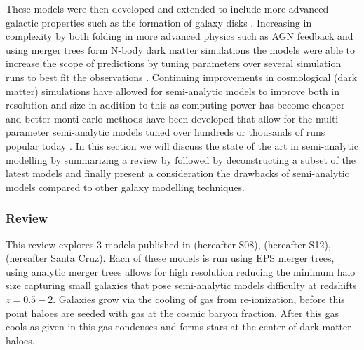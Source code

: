 
These models were then developed and extended to include more advanced galactic properties such as the formation of galaxy disks \citep{Mo1998TheDiscs}. Increasing in complexity by both folding in more advanced physics such as AGN feedback and using merger trees form N-body dark matter simulations the models were able to increase the scope of predictions by tuning parameters over several simulation runs to best fit the observations \citep{Bower2006BreakingFormation}. Continuing improvements in cosmological (dark matter) simulations have allowed for semi-analytic models to improve both in resolution and size in addition to this as computing power has become cheaper and better monti-carlo methods have been developed that allow for the multi-parameter semi-analytic models tuned over hundreds or thousands of runs popular today \citep{Guo2011FromCosmology,DeLucia2011TimesCosmology,Fontanot2011TheUniverse,Menci2014TriggeringInteractions,Somerville2015StarGas}.
In this section we will discuss the state of the art in semi-analytic modelling by summarizing a review by \citet{Somerville2015StarGas} followed by deconstructing a subset of the latest models and finally present a consideration the drawbacks of semi-analytic models compared to other galaxy modelling techniques.

\subsubsection{\citet{Somerville2015StarGas} Review}

This review explores 3 models published in \citet{Somerville2008ANuclei} (hereafter S08), \citet{Somerville2012GalaxyObservations} (hereafter S12), \citet{Porter2014ModellingSpace} (hereafter Santa Cruz). Each of these models is run using EPS merger trees, using analytic merger trees allows for high resolution reducing the minimum halo size capturing small galaxies that pose semi-analytic models difficulty at redshifts $z = 0.5 - 2$. Galaxies grow via the cooling of gas from re-ionization, before this point haloes are seeded with gas at the cosmic baryon fraction. After this gas cools as given in \cite{White1991GalaxyClustering} this gas condenses and forms stars at the center of dark matter haloes. 


